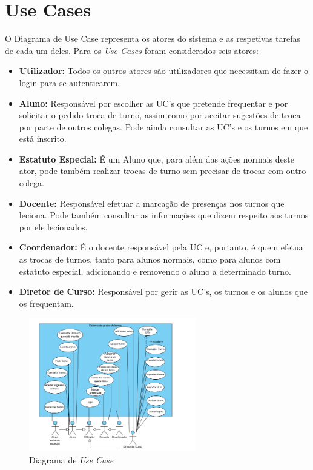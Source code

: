 \documentclass[12pt,a4paper]{report}
\begin{document}
\chapter{Use Cases}
O Diagrama de Use Case representa os atores do sistema e as respetivas tarefas de cada um deles.
Para os \textit{Use Cases} foram considerados seis atores:
\begin{itemize}
	\item \textbf{Utilizador:} Todos os outros atores são utilizadores que necessitam de fazer o login para se autenticarem.
	\item \textbf{Aluno:} Responsável por escolher as UC’s que pretende frequentar e por solicitar o pedido troca de turno, assim como por aceitar sugestões de troca por parte de outros colegas. Pode ainda consultar as UC’s e os turnos em que está inscrito.
	\item \textbf{Estatuto Especial:} É um Aluno que, para além das ações normais deste ator, pode também realizar trocas de turno sem precisar de trocar com outro colega.
	\item \textbf{Docente:} Responsável efetuar a marcação de presenças nos turnos que leciona. Pode também consultar as informações que dizem respeito aos turnos por ele lecionados.
	\item \textbf{Coordenador:} É o docente responsável pela UC e, portanto, é quem efetua as trocas de turnos, tanto para alunos normais, como para alunos com estatuto especial, adicionando e removendo o aluno a determinado turno.
	\item \textbf{Diretor de Curso:} Responsável por gerir as UC’s, os turnos e os alunos que os frequentam.
\end{itemize}
\nopagebreak
\begin{figure}[H]
	\centering 
	\includegraphics[height=220px]{modelacao/use_case.png}  
	\caption{Diagrama de \emph{Use Case}}
\end{figure} 
\end{document}
